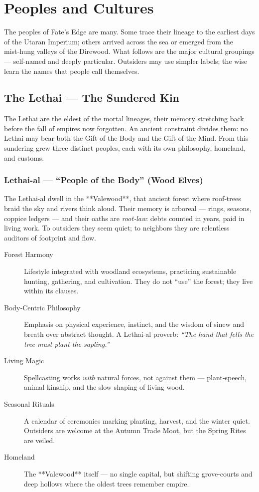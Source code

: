 \section{Peoples and Cultures}
\label{sec:peoples-cultures}

The peoples of Fate’s Edge are many. Some trace their lineage to the earliest days of the Utaran Imperium; others arrived across the sea or emerged from the mist‑hung valleys of the Direwood. What follows are the major cultural groupings — self‑named and deeply particular. Outsiders may use simpler labels; the wise learn the names that people call themselves.

\subsection*{The Lethai — The Sundered Kin}
\label{subsec:lethai}

The Lethai are the eldest of the mortal lineages, their memory stretching back before the fall of empires now forgotten. An ancient constraint divides them: no Lethai may bear both the Gift of the Body and the Gift of the Mind. From this sundering grew three distinct peoples, each with its own philosophy, homeland, and customs.

\subsubsection*{Lethai-al — “People of the Body” (Wood Elves)}
\label{subsubsec:lethai-al}

The Lethai-al dwell in the **Valewood**, that ancient forest where roof‑trees braid the sky and rivers think aloud. Their memory is arboreal — rings, seasons, coppice ledgers — and their oaths are \emph{root‑law}: debts counted in years, paid in living work. To outsiders they seem quiet; to neighbors they are relentless auditors of footprint and flow.

\begin{description}
\item[Forest Harmony] Lifestyle integrated with woodland ecosystems, practicing sustainable hunting, gathering, and cultivation. They do not “use” the forest; they live within its clauses.
\item[Body‑Centric Philosophy] Emphasis on physical experience, instinct, and the wisdom of sinew and breath over abstract thought. A Lethai‑al proverb: \emph{“The hand that fells the tree must plant the sapling.”}
\item[Living Magic] Spellcasting works \emph{with} natural forces, not against them — plant‑speech, animal kinship, and the slow shaping of living wood.
\item[Seasonal Rituals] A calendar of ceremonies marking planting, harvest, and the winter quiet. Outsiders are welcome at the Autumn Trade Moot, but the Spring Rites are veiled.
\item[Homeland] The **Valewood** itself — no single capital, but shifting grove‑courts and deep hollows where the oldest trees remember empire.
\end{description}

